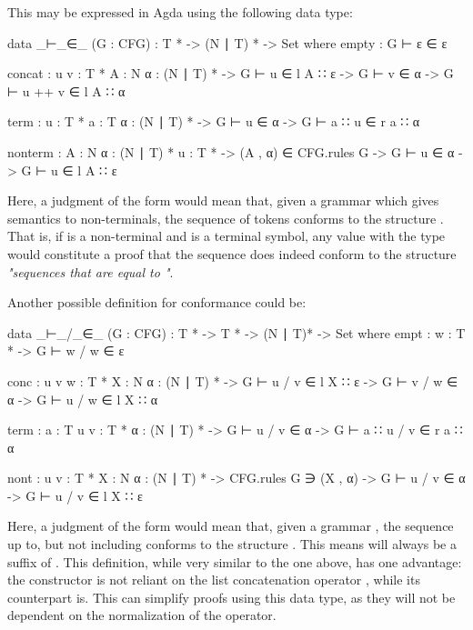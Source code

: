 	This may be expressed in Agda using the following data type:

	\begin{code}
		data _⊢_∈_ (G : CFG) :  T * -> (N ∣ T) * -> Set where
		  empty :
		    G ⊢ ε ∈ ε

		  concat : {u v : T *} {A : N} {α : (N ∣ T) *} ->
		    G ⊢ u ∈ l A ∷ ε -> G ⊢ v ∈ α -> G ⊢ u ++ v ∈ l A ∷ α

		  term : {u : T *} {a : T} {α : (N ∣ T) *} ->
		    G ⊢ u ∈ α -> G ⊢ a ∷ u ∈ r a ∷ α

		  nonterm : {A : N} {α : (N ∣ T) *} {u : T *} ->
		    (A , α) ∈ CFG.rules G -> G ⊢ u ∈ α -> G ⊢ u ∈ l A ∷ ε
	\end{code}

	Here, a judgment of the form  would mean that, given a
	grammar  which gives semantics to non-terminals, the sequence of
	tokens  conforms to the structure . That is, if
	 is a non-terminal and  is a terminal symbol, any value
	with the type  would constitute a proof
	that the sequence  does indeed conform to the structure
	\emph{"sequences that are equal to "}.

	Another possible definition for conformance could be:

	\begin{code}
		data _⊢_/_∈_ (G : CFG) : T * -> T * -> (N ∣ T)* -> Set where
		  empt : {w : T *} ->
		    G ⊢ w / w ∈ ε

		  conc : {u v w : T *} {X : N} {α : (N ∣ T) *} ->
		    G ⊢ u / v ∈ l X ∷ ε ->
		    G ⊢ v / w ∈ α ->
		      G ⊢ u / w ∈ l X ∷ α

		  term : {a : T} {u v : T *} {α : (N ∣ T) *} ->
		    G ⊢ u / v ∈ α ->
		      G ⊢ a ∷ u / v ∈ r a ∷ α

		  nont : {u v : T *} {X : N} {α : (N ∣ T) *} ->
		    CFG.rules G ∋ (X , α) ->
		    G ⊢ u / v ∈ α ->
		    G ⊢ u / v ∈ l X ∷ ε
	\end{code}

	Here, a judgment of the form  would mean that, given
	a grammar , the sequence  up to, but not including
	 conforms to the structure . This means  will
	always be a suffix of . This definition, while very similar to
	the one above, has one advantage: the constructor  is not
	reliant on the list concatenation operator \codett{++}, while its
	counterpart  is. This can simplify proofs using this data
	type, as they will not be dependent on the normalization of the \codett{++}
	operator.

